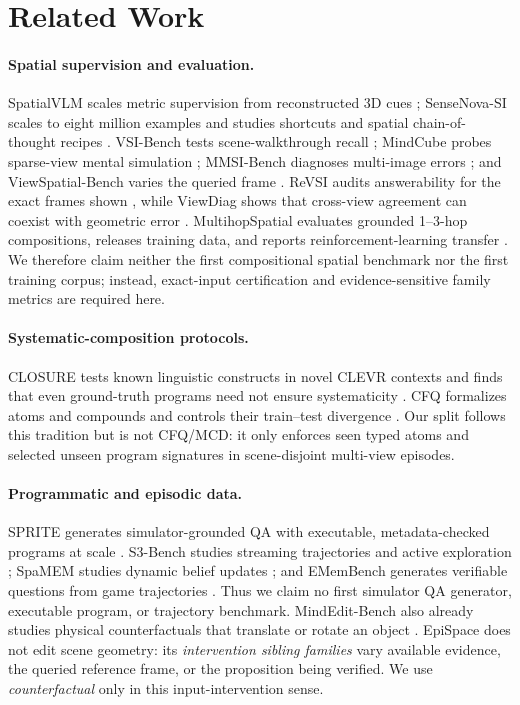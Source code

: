 \section{Related Work}
\label{sec:related}

\paragraph{Spatial supervision and evaluation.}
SpatialVLM scales metric supervision from reconstructed 3D cues
\citep{chen2024spatialvlm}; SenseNova-SI scales to eight million examples and
studies shortcuts and spatial chain-of-thought recipes
\citep{cai2025sensenova}.  VSI-Bench tests scene-walkthrough recall
\citep{yang2024thinking}; MindCube probes sparse-view mental simulation
\citep{yin2025mindcube}; MMSI-Bench diagnoses multi-image errors
\citep{yang2025mmsi}; and ViewSpatial-Bench varies the queried frame
\citep{li2025viewspatial}.  ReVSI audits answerability for the exact frames
shown \citep{revsi2026}, while ViewDiag shows that cross-view agreement can
coexist with geometric error \citep{viewdiag2026}.  MultihopSpatial evaluates
grounded 1--3-hop compositions, releases training data, and reports
reinforcement-learning transfer \citep{lee2026multihopspatial}.  We therefore
claim neither the first compositional spatial benchmark nor the first training
corpus; instead, exact-input certification and evidence-sensitive family
metrics are required here.

\paragraph{Systematic-composition protocols.}
CLOSURE tests known linguistic constructs in novel CLEVR contexts and finds
that even ground-truth programs need not ensure systematicity
\citep{bahdanau2019closure}.  CFQ formalizes atoms and compounds and controls
their train--test divergence \citep{keysers2020measuring}.  Our split follows
this tradition but is not CFQ/MCD: it only enforces seen typed atoms and
selected unseen program signatures in scene-disjoint multi-view episodes.

\paragraph{Programmatic and episodic data.}
SPRITE generates simulator-grounded QA with executable, metadata-checked
programs at scale \citep{sprite2026}.  S3-Bench studies streaming trajectories
and active exploration \citep{s3bench2026}; SpaMEM studies dynamic belief
updates \citep{spamem2026}; and EMemBench generates verifiable questions from
game trajectories \citep{emembench2026}.  Thus we claim no first simulator QA
generator, executable program, or trajectory benchmark.  MindEdit-Bench also
already studies physical counterfactuals that translate or rotate an object
\citep{yu2026mindedit}.  EpiSpace does not edit scene geometry: its
\emph{intervention sibling families} vary available evidence, the queried
reference frame, or the proposition being verified.  We use
\emph{counterfactual} only in this input-intervention sense.

